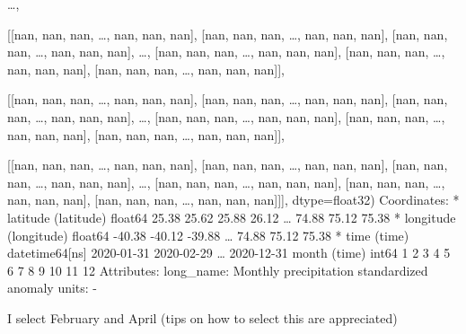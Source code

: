 \documentclass[letterpaper,10pt,english]{sphinxmanual}
\begin{document}
{\begin{sphinxVerbatim}[commandchars=\\\{\}]
       {\ldots},

       [[nan, nan, nan, {\ldots}, nan, nan, nan],
        [nan, nan, nan, {\ldots}, nan, nan, nan],
        [nan, nan, nan, {\ldots}, nan, nan, nan],
        {\ldots},
        [nan, nan, nan, {\ldots}, nan, nan, nan],
        [nan, nan, nan, {\ldots}, nan, nan, nan],
        [nan, nan, nan, {\ldots}, nan, nan, nan]],

       [[nan, nan, nan, {\ldots}, nan, nan, nan],
        [nan, nan, nan, {\ldots}, nan, nan, nan],
        [nan, nan, nan, {\ldots}, nan, nan, nan],
        {\ldots},
        [nan, nan, nan, {\ldots}, nan, nan, nan],
        [nan, nan, nan, {\ldots}, nan, nan, nan],
        [nan, nan, nan, {\ldots}, nan, nan, nan]],

       [[nan, nan, nan, {\ldots}, nan, nan, nan],
        [nan, nan, nan, {\ldots}, nan, nan, nan],
        [nan, nan, nan, {\ldots}, nan, nan, nan],
        {\ldots},
        [nan, nan, nan, {\ldots}, nan, nan, nan],
        [nan, nan, nan, {\ldots}, nan, nan, nan],
        [nan, nan, nan, {\ldots}, nan, nan, nan]]], dtype=float32)
Coordinates:
  * latitude   (latitude) float64 25.38 25.62 25.88 26.12 {\ldots} 74.88 75.12 75.38
  * longitude  (longitude) float64 -40.38 -40.12 -39.88 {\ldots} 74.88 75.12 75.38
  * time       (time) datetime64[ns] 2020-01-31 2020-02-29 {\ldots} 2020-12-31
    month      (time) int64 1 2 3 4 5 6 7 8 9 10 11 12
Attributes:
    long\_name:  Monthly precipitation standardized anomaly
    units:      -
\end{sphinxVerbatim}
}

I select February and April (tips on how to select this are appreciated)

{
\begin{sphinxVerbatim}[commandchars=\\\{\}]
\llap{\color{nbsphinxin}[38]:\,\hspace{\fboxrule}\hspace{\fboxsep}}
\PYG{p}{[}\PYG{p}{[}\PYG{p}{]}\PYG{p}{]} 

\end{sphinxVerbatim}
}
\end{document}
